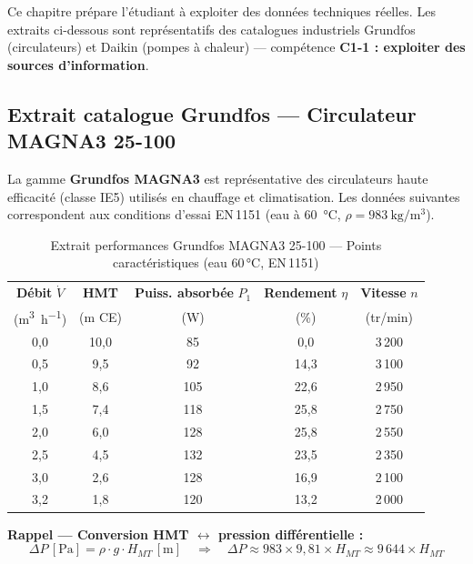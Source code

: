 Ce chapitre prépare l'étudiant à exploiter des données techniques réelles. Les extraits
ci-dessous sont représentatifs des catalogues industriels Grundfos (circulateurs) et
Daikin (pompes à chaleur) — compétence \textbf{C1-1 : exploiter des sources d'information}.

\subsection{Extrait catalogue Grundfos — Circulateur MAGNA3 25-100}

La gamme \textbf{Grundfos MAGNA3} est représentative des circulateurs haute efficacité
(classe IE5) utilisés en chauffage et climatisation. Les données suivantes correspondent
aux conditions d'essai EN\,1151 (eau à \SI{60}{\celsius}, $\rho = \SI{983}{\kilogram\per\metre\cubed}$).

\begin{table}[H]
  \centering\sffamily\small
  \caption{Extrait performances Grundfos MAGNA3 25-100 — Points caractéristiques (eau 60\,°C, EN\,1151)}
  \label{tab:grundfos-magna3}
  \begin{tabular}{|c|c|c|c|c|}
    \hline
    \textbf{Débit} $\dot{V}$ & \textbf{HMT} & \textbf{Puiss. absorbée} $P_1$ & \textbf{Rendement} $\eta$ & \textbf{Vitesse} $n$ \\
    (\si{\metre\cubed\per\hour}) & (\si{\meter} CE) & (\si{\watt}) & (\%) & (tr/min) \\
    \hline
    0{,}0 & 10{,}0 &  85 &  0{,}0 & 3\,200 \\
    0{,}5 &  9{,}5 &  92 & 14{,}3 & 3\,100 \\
    1{,}0 &  8{,}6 & 105 & 22{,}6 & 2\,950 \\
    1{,}5 &  7{,}4 & 118 & 25{,}8 & 2\,750 \\
    2{,}0 &  6{,}0 & 128 & 25{,}8 & 2\,550 \\
    2{,}5 &  4{,}5 & 132 & 23{,}5 & 2\,350 \\
    3{,}0 &  2{,}6 & 128 & 16{,}9 & 2\,100 \\
    3{,}2 &  1{,}8 & 120 & 13{,}2 & 2\,000 \\
    \hline
  \end{tabular}
\end{table}

\textbf{Rappel — Conversion HMT $\leftrightarrow$ pression différentielle :}
\begin{equation}
  \Delta P\,[\si{\pascal}] = \rho \cdot g \cdot H_{MT}\,[\si{\meter}]
  \quad\Rightarrow\quad
  \Delta P \approx 983 \times 9{,}81 \times H_{MT} \approx 9\,644 \times H_{MT}
  \label{eq:hmt-dp}
\end{equation}

